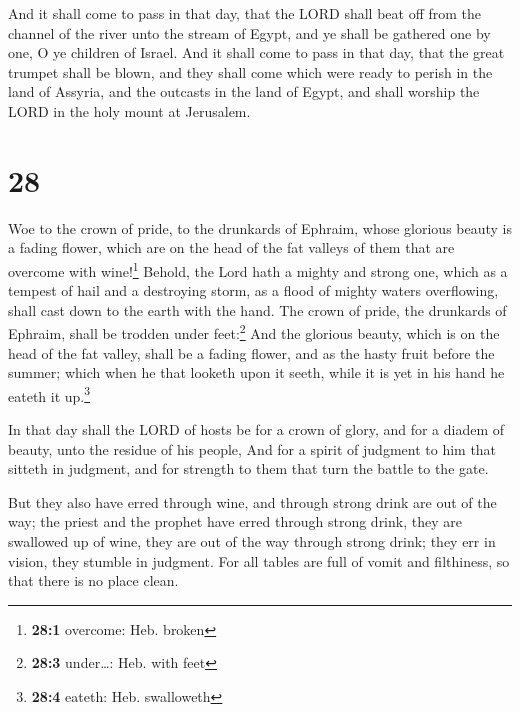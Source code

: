 And it shall come to pass in that day, that the LORD
shall beat off from the channel of the river unto the stream of Egypt,
and ye shall be gathered one by one, O ye children of Israel.
 And it shall come to pass in that day, that the great
trumpet shall be blown, and they shall come which were ready to perish
in the land of Assyria, and the outcasts in the land of Egypt, and shall
worship the LORD in the holy mount at Jerusalem.

\hypertarget{section-27}{%
\section{28}\label{section-27}}

 Woe to the crown of pride, to the drunkards of Ephraim,
whose glorious beauty is a fading flower, which are on the head of the
fat valleys of them that are overcome with wine!\footnote{\textbf{28:1}
  overcome: Heb. broken}  Behold, the Lord hath a mighty
and strong one, which as a tempest of hail and a destroying storm, as a
flood of mighty waters overflowing, shall cast down to the earth with
the hand.  The crown of pride, the drunkards of Ephraim,
shall be trodden under feet:\footnote{\textbf{28:3} under\ldots: Heb.
  with feet}  And the glorious beauty, which is on the
head of the fat valley, shall be a fading flower, and as the hasty fruit
before the summer; which when he that looketh upon it seeth, while it is
yet in his hand he eateth it up.\footnote{\textbf{28:4} eateth: Heb.
  swalloweth}

 In that day shall the LORD of hosts be for a crown of
glory, and for a diadem of beauty, unto the residue of his people,
 And for a spirit of judgment to him that sitteth in
judgment, and for strength to them that turn the battle to the gate.

 But they also have erred through wine, and through strong
drink are out of the way; the priest and the prophet have erred through
strong drink, they are swallowed up of wine, they are out of the way
through strong drink; they err in vision, they stumble in judgment.
 For all tables are full of vomit and filthiness, so that
there is no place clean.

